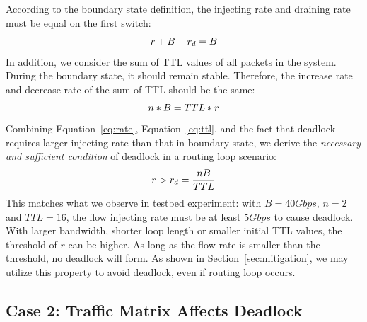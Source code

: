 According to the boundary state definition, the injecting rate and draining rate
must be equal on the first switch:
\begin{equation}
\small
r + B - r_d = B
\label{eq:rate}
\end{equation}
In addition, we consider the sum of TTL values of all packets in the system.
During the boundary state, it should remain stable. Therefore, the increase
rate and decrease rate of the sum of TTL should be the same:
\begin{equation}
\small
n * B = TTL * r
\label{eq:ttl}
\end{equation}
Combining Equation~\ref{eq:rate}, Equation~\ref{eq:ttl}, and the fact that
deadlock requires larger injecting rate than that in boundary state, we derive the
{\em necessary and sufficient condition} of deadlock in a routing loop scenario:
\begin{equation}
\small
r > r_d = \frac{nB}{TTL}
\label{eq:condition}
\end{equation}
This matches what we observe in testbed experiment: with $B=40Gbps$, $n=2$ and
$TTL=16$, the flow injecting rate must be at least $5Gbps$ to cause deadlock. With larger bandwidth,
shorter loop length or smaller initial TTL values, the threshold of $r$ can be higher.
As long as the flow rate is smaller than the threshold, no deadlock will form.
As shown in Section~\ref{sec:mitigation}, we may utilize this property to avoid deadlock,
even if routing loop occurs.

\secspace
\subsection{Case 2: Traffic Matrix Affects Deadlock}
\secspace


